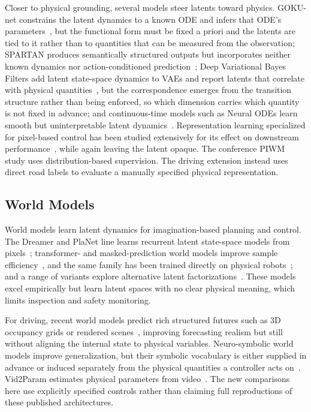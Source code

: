 \documentclass[preprint,12pt]{elsarticle}
\begin{document}
Closer to physical grounding, several models steer latents toward physics.
GOKU-net constrains the latent dynamics to a known ODE and infers that ODE's
parameters~\cite{linial_generative_2021}, but the functional form must be fixed a
priori and the latents are tied to it rather than to quantities that can be
measured from the observation; SPARTAN produces
semantically structured outputs but incorporates neither known dynamics nor
action-conditioned prediction~\cite{lei2024spartan}; Deep Variational Bayes
Filters add latent state-space dynamics to VAEs and report latents that correlate
with physical quantities~\cite{karl2016deep}, but the correspondence emerges from
the transition structure rather than being enforced, so which dimension carries
which quantity is not fixed in advance; and continuous-time models such as Neural
ODEs learn smooth but uninterpretable latent dynamics~\cite{chen2018neural}.
Representation learning specialized for pixel-based control has been studied
extensively for its effect on downstream
performance~\cite{tomar2021learningrepresentationspixelbasedcontrol}, while again
leaving the latent opaque.
The conference PIWM study uses distribution-based supervision. The driving
extension instead uses direct road labels to evaluate a manually specified
physical representation.

\subsection{World Models}\label{sec:rw_wm}

World models learn latent dynamics for imagination-based planning and control.
The Dreamer and PlaNet line learns recurrent latent state-space models from
pixels~\cite{hafner2019learning, hafner2020mastering, hafner2023mastering};
transformer- and masked-prediction world models improve sample
efficiency~\cite{micheli2022transformers, seo2023masked}, and the same family has
been trained directly on physical robots~\cite{wu2023daydreamer}; and a range of
variants explore alternative latent
factorizations~\cite{ha2018world, zhang2021world, zhao2024decomposed}.
These models excel empirically but learn latent spaces with no clear physical
meaning, which limits inspection and safety monitoring.

For driving, recent world models predict rich structured futures such as 3D
occupancy grids or rendered scenes~\cite{zheng2024occworld, min2023uniworld,
yan2024renderworld, zuo2024gaussianworld}, improving forecasting realism but still
without aligning the internal state to physical variables.
Neuro-symbolic world models improve generalization, but their symbolic vocabulary
is either supplied in advance or induced separately from the physical
quantities a controller acts on~\cite{balloch2023neuro, liang2024visualpredicator}.
Vid2Param estimates physical parameters from video~\cite{asenov2019vid2param}.
The new comparisons here use explicitly specified controls rather than claiming
full reproductions of these published architectures.
\end{document}
